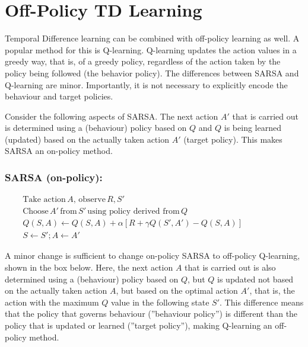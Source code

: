 \section{Off-Policy TD Learning}

Temporal Difference learning can be combined with off-policy learning as well. A popular method for this is Q-learning. Q-learning updates the action values in a greedy way, that is, of a greedy policy, regardless of the action taken by the policy being followed (the behavior policy). The differences between SARSA and Q-learning are minor. Importantly, it is not necessary to explicitly encode the behaviour and target policies.

Consider the following aspects of SARSA. The next action $A'$ that is carried out is determined using a (behaviour) policy based on $Q$ and $Q$ is being learned (updated) based on the actually taken action $A'$ (target policy). This makes SARSA an on-policy method.

\begin{pseudocodebox}
\setlength{\abovedisplayskip}{0pt}
\setlength{\belowdisplayskip}{0pt}
\setlength{\abovedisplayshortskip}{0pt}
\setlength{\belowdisplayshortskip}{0pt}
\subsubsection*{SARSA (on-policy):} 

\begin{align*}
& \text{Take action}\, A, \, \text{observe} \, R, S' \\
& \text{Choose}\, A' \, \text{from}\, S' \, \text{using policy derived from} \, Q \\ 
&  Q(S, A) \leftarrow Q(S, A) + \alpha \left[ R + \gamma Q(S', A') - Q(S, A) \right] \hspace{1in}\\
&  S \leftarrow S'; A \leftarrow A'
\end{align*}
\end{pseudocodebox}

A minor change is sufficient to change on-policy SARSA to off-policy Q-learning, shown in the box below. Here, the next action $A$ that is carried out is also determined using a (behaviour) policy based on $Q$, but $Q$ is updated not based on the actually taken action $A$, but based on the optimal action $A'$, that is, the action with the maximum $Q$ value in the following state $S'$. This difference means that the policy that governs behaviour (''behaviour policy'') is different than the policy that is updated or learned (''target policy''), making Q-learning an off-policy method. 


